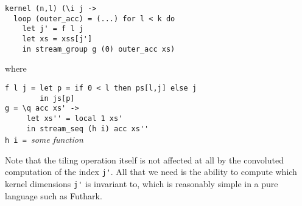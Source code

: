 \begin{lstlisting}[xleftmargin=0.5cm]
kernel (n,l) (\i j ->
  loop (outer_acc) = (...) for l < k do
    let j' = f l j
    let xs = xss[j']
    in stream_group g (0) outer_acc xs)
\end{lstlisting}
\begin{minipage}[t]{0.1\linewidth}
  \begin{flushright}
    where
  \end{flushright}
\end{minipage}
\begin{minipage}[t]{0.8\linewidth}
\lstinline{f l j = let p = if 0 < l then ps[l,j] else j}\\
\lstinline{        in js[p]}\\
\lstinline{g = \q acc xs' ->}\\
\lstinline{     let xs'' = local 1 xs'}\\
\lstinline{     in stream_seq (h i) acc xs''}\\
\lstinline{h i = }\textit{some function}
\end{minipage}
\vspace{1em}

Note that the tiling operation itself is not affected at all by the
convoluted computation of the index \lstinline{j'}.  All that we need
is the ability to compute which kernel dimensions \lstinline{j'} is
invariant to, which is reasonably simple in a pure language such as
Futhark.


